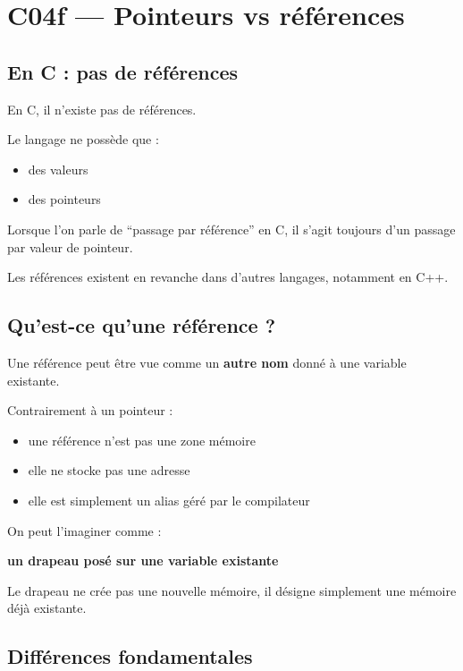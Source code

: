 \section{C04f — Pointeurs vs références}

\subsection{En C : pas de références}

En C, il n’existe pas de références.

Le langage ne possède que :

\begin{itemize}
    \item des valeurs
    \item des pointeurs
\end{itemize}

Lorsque l’on parle de ``passage par référence'' en C,
il s’agit toujours d’un passage par valeur de pointeur.

Les références existent en revanche dans d’autres langages,
notamment en C++.

\subsection{Qu’est-ce qu’une référence ?}

Une référence peut être vue comme un \textbf{autre nom}
donné à une variable existante.

Contrairement à un pointeur :

\begin{itemize}
    \item une référence n’est pas une zone mémoire
    \item elle ne stocke pas une adresse
    \item elle est simplement un alias géré par le compilateur
\end{itemize}

On peut l’imaginer comme :

\begin{center}
\textbf{un drapeau posé sur une variable existante}
\end{center}

Le drapeau ne crée pas une nouvelle mémoire,
il désigne simplement une mémoire déjà existante.

\subsection{Différences fondamentales}

